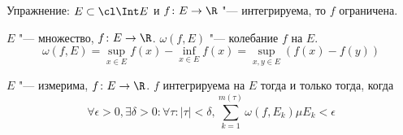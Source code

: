 
Упражнение: $E \subset \cl \Int E$ и $f\colon E \to \R$ "--- интегрируема, то $f$ ограничена.

\begin{Def}
	$E$ "--- множество, $f\colon E \to \R$.
	$\omega(f, E)$ "--- колебание $f$ на $E$.
	\[ \omega(f, E) = \sup_{x \in E} f(x) - \inf_{x \in E} f(x) = \sup_{x, y \in E} (f(x) - f(y)) \]
\end{Def}

\begin{theorem}
	$E$ "--- измерима, $f\colon E \to \R$.
	$f$ интегрируема на $E$ тогда и только тогда, когда
	\[ \forall \epsilon > 0, \exists \delta > 0\colon \forall \tau\colon |\tau| < \delta, \sum_{k=1}^{m(\tau)} \omega(f, E_k) \mu E_k < \epsilon\]
\end{theorem}
